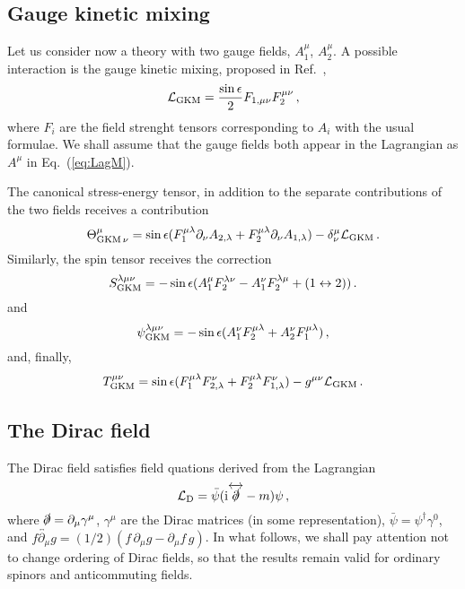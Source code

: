 \documentclass[a4paper,12pt]{article}
\def\imagi{\mathrm{i}}
\def\lag{{\mathcal{L}}}
\begin{document}
\subsection{Gauge kinetic mixing}\label{ssec:gkm}
Let us consider now a theory with two gauge fields, $A_1^\mu$, $A_2^\mu$. A possible interaction is the gauge kinetic mixing, proposed in Ref.\ \cite{holdom},
\begin{equation}\label{eq:laggkm}
 \lag_{\rm GKM} = \frac{\sin\epsilon}{2}F_{1,\mu\nu}F_2^{\mu\nu}\,,
\end{equation}
where $F_{i}$ are the field strenght tensors corresponding to $A_i$ with the usual formulae. We shall assume that the gauge fields both appear in the Lagrangian as $A^\mu$ in Eq.\ (\ref{eq:LagM}).

The canonical stress-energy tensor, in addition to the separate contributions of the two fields receives a contribution
\begin{equation}\label{eq:EMcanGKM}
\Theta^\mu_{{\rm GKM}\,\nu}  = \sin\epsilon (F^{\mu\lambda}_1 \partial_\nu A_{2,\lambda} + F^{\mu\lambda}_2 \partial_\nu A_{1,\lambda}) -\delta^\mu_\nu \lag_{\rm GKM}\,.
\end{equation}
Similarly, the spin tensor receives the correction
\begin{equation}\label{eq:SpinGKM}
 S^{\lambda\mu\nu}_{\rm GKM} = -\sin\epsilon(A^\mu_1 F^{\lambda\nu}_2 -A^\nu_1 F^{\lambda\mu}_2 + (1\leftrightarrow 2))\,.
\end{equation}
and
\begin{equation}\label{eq:BRGKM}
\psi_{\rm GKM}^{\lambda\mu\nu} = -\sin\epsilon(A^\nu_1 F_2^{\mu\lambda}+A^\nu_2 F_1^{\mu\lambda})\,, 
\end{equation}
and, finally,
\begin{equation}\label{eq:SymmGKM}
 T^{\mu\nu}_{\rm GKM} = \sin\epsilon ( F^{\mu\lambda}_1 F^\nu_{2,\lambda} +F^{\mu\lambda}_2 F^\nu_{1,\lambda})-g^{\mu\nu}\lag_{\rm GKM}\,.
\end{equation}









\subsection{The Dirac field}\label{ssec:Dirac}
The Dirac field satisfies field quations derived from the Lagrangian
\begin{equation}\label{eq:LagD}
 \lag_{\rm D} =\bar{\psi}(\imagi\overleftrightarrow{\slashed{\partial}}-m)\psi\,,
\end{equation}
where $\slashed{\partial}=\partial_\mu\gamma^\mu$, $\gamma^\mu$ are the Dirac matrices (in some representation), $\bar\psi=\psi^\dagger\gamma^0$, and $f\overleftrightarrow{\partial_\mu}g = (1/2)(f\,\partial_\mu g-\partial_\mu f\,g)$. In what follows, we shall pay attention not to change ordering of Dirac fields, so that the results remain valid for ordinary spinors and anticommuting fields.
\end{document}
